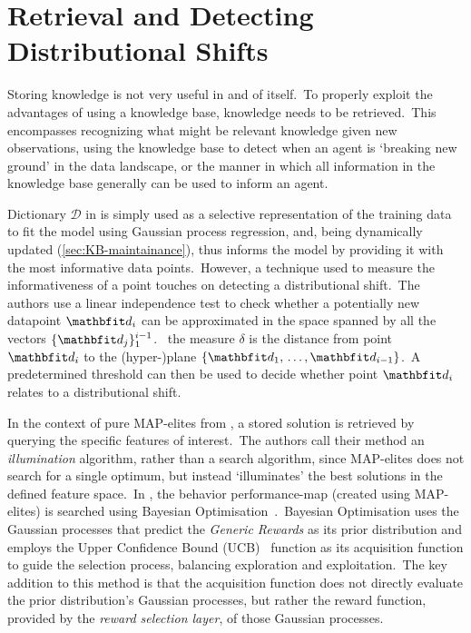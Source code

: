 \section{Retrieval and Detecting Distributional Shifts}\label{sec:retrieval}
Storing knowledge is not very useful in and of itself.\ To properly exploit the advantages of using a knowledge base, knowledge needs to be retrieved.\ This encompasses recognizing what might be relevant knowledge given new observations, using the knowledge base to detect when an agent is `breaking new ground' in the data landscape, or the manner in which all information in the knowledge base generally can be used to inform an agent.

Dictionary $\mathcal{D}$ in \textcite{Nguyen2011} is simply used as a selective representation of the training data to fit the model using Gaussian process regression, and, being dynamically updated (\cref{sec:KB-maintainance}), thus informs the model by providing it with the most informative data points.\ However, a technique used to measure the informativeness of a point touches on detecting a distributional shift.\ The authors use a linear independence test to check whether a potentially new datapoint $\bvec{d}_i$ can be approximated in the space spanned by all the vectors $\{\bvec{d}_j\}_{1}^{i-1}$.\  the measure $\delta$ is the distance from point $\bvec{d}_i$ to the (hyper-)plane $\{\bvec{d}_1,\,\dots,\bvec{d}_{i-1}\}$.\ A predetermined threshold can then be used to decide whether point $\bvec{d}_i$ relates to a distributional shift.

In the context of pure MAP-elites from \textcite{Mouret2015}, a stored solution is retrieved by querying the specific features of interest.\ The authors call their method an \emph{illumination} algorithm, rather than a search algorithm, since MAP-elites does not search for a single optimum, but instead `illuminates' the best solutions in the defined feature space.\ In \textcite{Chatzilygeroudis2016}, the behavior performance-map (created using MAP-elites) is searched using Bayesian Optimisation~\cite{Brochu2010}.\ Bayesian Optimisation uses the Gaussian processes that predict the \emph{Generic Rewards} as its prior distribution and employs the Upper Confidence Bound (UCB)~\cite{Brochu2010} function as its acquisition function to guide the selection process, balancing exploration and exploitation.\ The key addition to this method is that the acquisition function does not directly evaluate the prior distribution's Gaussian processes, but rather the reward function, provided by the \emph{reward selection layer}, of those Gaussian processes.

